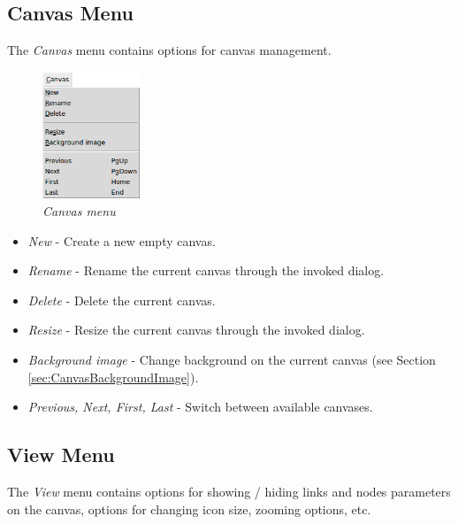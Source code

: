   \subsection{Canvas Menu}
  The \emph{Canvas} menu contains options for canvas management.
  
  \begin{figure}[H]
  \centering
  \vspace{10pt}
  \includegraphics[width=0.26\textwidth]{./images/canvas_menu.png}
  \caption{\emph{Canvas menu}}
  \label{fig:canvas_menu}
  \end{figure}
  
  \begin{itemize}
  \item \emph{New} - Create a new empty canvas.
  \item \emph{Rename} - Rename the current canvas through the invoked dialog.
  \item \emph{Delete} - Delete the current canvas.
  \item \emph{Resize} - Resize the current canvas through the invoked dialog.
  \item \emph{Background image} - Change background on the current canvas (see
Section \ref{sec:CanvasBackgroundImage}).
  \item \emph{Previous, Next, First, Last} - Switch between available canvases.
  \end{itemize}
  
  \subsection{View Menu}
  The \emph{View} menu contains options for showing / hiding links and nodes
parameters on the canvas, options for changing icon size, zooming options, etc.
  
